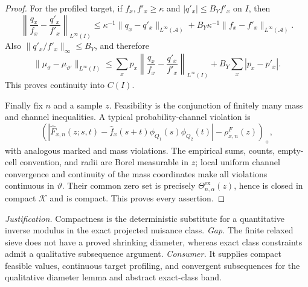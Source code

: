 \documentclass{article}
\begin{document}
\begin{proof}
For the profiled target, if \(f_x,f'_x\ge\kappa\) and
\(|q'_x|\le B_Yf'_x\) on \(I\), then
\[
 \left\|\frac{q_x}{f_x}-\frac{q'_x}{f'_x}\right\|_{L^\infty(I)}
 \le\kappa^{-1}\|q_x-q'_x\|_{L^\infty(\mathcal A)}
   +B_Y\kappa^{-1}\|f_x-f'_x\|_{L^\infty(\mathcal A)}.         \tag{13}
\]
Also \(\|q'_x/f'_x\|_\infty\le B_Y\), and therefore
\[
 \|\mu_\vartheta-\mu_{\vartheta'}\|_{L^\infty(I)}
 \le\sum_xp_x
 \left\|\frac{q_x}{f_x}-\frac{q'_x}{f'_x}\right\|_{L^\infty(I)}
 +B_Y\sum_x|p_x-p'_x|.                                          \tag{14}
\]
This proves continuity into \(C(I)\).

Finally fix \(n\) and a sample \(z\).  Feasibility is the conjunction of
finitely many mass and channel inequalities.  A typical probability-channel
violation is
\[
 \left(
 \left|\widehat F_{x,n}(z;s,t)-
 \widehat f_x(s+t)\phi_{Q_1}(s)\phi_{Q_2}(t)\right|
 -\rho^F_{x,n}(z)
 \right)_+,                                                      \tag{15}
\]
with analogous marked and mass violations.  The empirical sums, counts,
empty-cell convention, and radii are Borel measurable in \(z\); local
uniform channel convergence and continuity of the mass coordinates make all
violations continuous in \(\vartheta\).  Their common zero set is precisely
\(\Theta^{\mathrm{ex}}_{n,\alpha}(z)\), hence is closed in compact
\(\mathscr K\) and is compact.  This proves every assertion.
\end{proof}
\par\smallskip\noindent \textit{Justification.} Compactness is the deterministic substitute for a quantitative inverse modulus in the exact projected nuisance class. \textit{Gap.} The finite relaxed sieve does not have a proved shrinking diameter, whereas exact class constraints admit a qualitative subsequence argument. \textit{Consumer.} It supplies compact feasible values, continuous target profiling, and convergent subsequences for the qualitative diameter lemma and abstract exact-class band.
\end{document}
